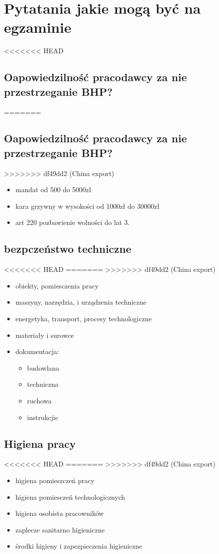 \documentclass[11pt]{article}
\author{Rafał Grot}
\date{\today}
\title{}
\begin{document}
\tableofcontents

\section{Pytatania jakie mogą być na egzaminie}
<<<<<<< HEAD
\label{sec:org62dca8d}
\subsection{Oapowiedzilność pracodawcy za nie przestrzeganie BHP?}
\label{sec:org13f6aa8}
=======
\label{sec:org31e3b30}
\subsection{Oapowiedzilność pracodawcy za nie przestrzeganie BHP?}
\label{sec:org7ff5fed}
>>>>>>> df49dd2 (China export)
\begin{itemize}
\item mandat od 500 do 5000zł
\item kara grzywny w wysokości od 1000zł do 30000zł
\item art 220 pozbawienie wolności do lat 3.
\end{itemize}
\subsection{bezpczeństwo techniczne}
<<<<<<< HEAD
\label{sec:org49cf96a}
=======
\label{sec:org953c4a8}
>>>>>>> df49dd2 (China export)
\begin{itemize}
\item obiekty, pomiesczenia pracy
\item maszyny, narzędzia, i urządzenia techniczne
\item energetyka, transport, procesy technologiczne
\item materiały i surowce
\item dokumentacja:
\begin{itemize}
\item budowlana
\item techniczna
\item ruchowa
\item instrukcjie
\end{itemize}
\end{itemize}
\subsection{Higiena pracy}
<<<<<<< HEAD
\label{sec:orgca11f3c}
=======
\label{sec:org1f47017}
>>>>>>> df49dd2 (China export)
\begin{itemize}
\item higiena pomieszczeń pracy
\item higiena pomiesczeń technologicznych
\item higiena osobista pracowników
\item zaplecze sanitarno higieniczne
\item środki higieny i zapezpieczenia higieniczne
\end{itemize}
\end{document}
